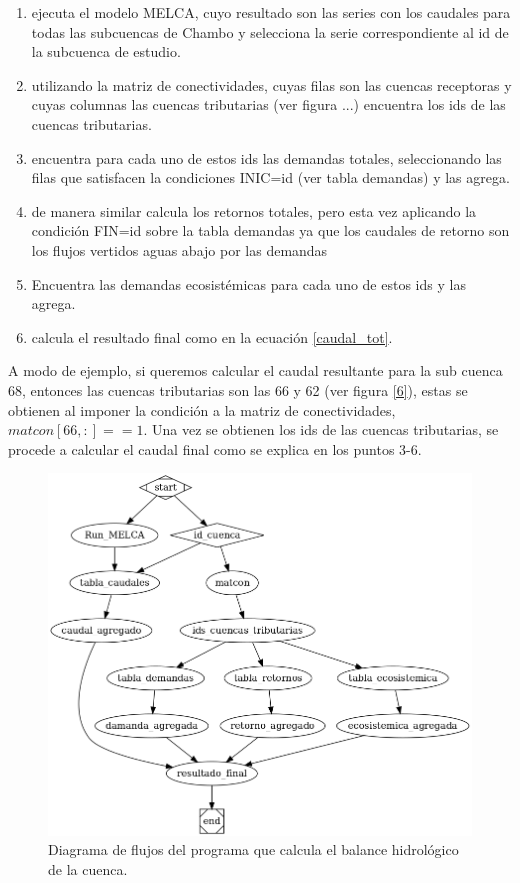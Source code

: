 \begin{enumerate}
    \item ejecuta el modelo MELCA, cuyo resultado son las series con los caudales para todas las subcuencas de Chambo y selecciona
    la serie correspondiente al id de la subcuenca de estudio.
    \item utilizando la matriz de conectividades, cuyas filas  son las cuencas receptoras y cuyas columnas las cuencas 
    tributarias (ver figura ...) encuentra los ids de las cuencas tributarias.
    \item encuentra para cada uno de estos ids las demandas totales, seleccionando las filas que satisfacen la condiciones
    INIC=id (ver tabla demandas) y las agrega. 
    \item de manera similar calcula los retornos totales, pero esta vez aplicando la condición  FIN=id sobre la tabla demandas 
    ya que los caudales de retorno son los flujos vertidos aguas abajo por las demandas
    \item Encuentra las demandas ecosistémicas para cada uno de estos ids y las agrega.
    \item calcula el resultado final  como en la ecuación \ref{caudal_tot}.
\end{enumerate}


A modo de ejemplo, si queremos calcular el caudal resultante para la sub cuenca 68, entonces las cuencas tributarias son las 66 y 62
(ver figura \ref{6}), estas se obtienen al imponer la condición a la matriz de conectividades, $matcon[66,:]==1$. Una vez se obtienen
los ids de las cuencas tributarias, se procede a calcular el caudal final como se explica en los puntos 3-6.


\begin{figure}[h!]
    \begin{center}
      \includegraphics[height=5.in]{Figures/graphviz.png}
      \caption{Diagrama de flujos del programa que calcula el balance hidrológico de la cuenca.}
      \label{7}
    \end{center}
  \end{figure}


